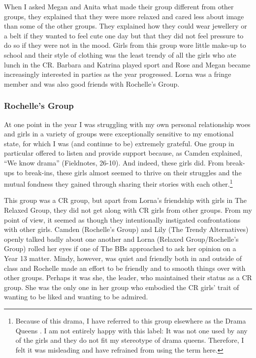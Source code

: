 
When I asked Megan and Anita what made their group different from other groups, they explained that they were more relaxed and cared less about image than some of the other groups. They explained how they could wear jewellery or a belt if they wanted to feel cute one day but that they did not feel pressure to do so if they were not in the mood. Girls from this group wore little make-up to school and their style of clothing was the least trendy of all the girls who ate lunch in the CR. Barbara and Katrina played sport and Rose and Megan became increasingly interested in parties as the year progressed. Lorna was a fringe member and was also good friends with Rochelle's Group.

\subsubsection{Rochelle's Group}
At one point in the year I was struggling with my own personal relationship woes and girls in a variety of groups were exceptionally sensitive to my emotional state, for which I was (and continue to be) extremely grateful. One group in particular offered to listen and provide support because, as Camden explained, ``We know drama'' (Fieldnotes, 26-10). And indeed, these girls did. From break-ups to break-ins, these girls almost seemed to thrive on their struggles and the mutual fondness they gained through sharing their stories with each other.\footnote{Because of this drama, I have referred to this group elsewhere as the Drama Queens \citep{drager2008lsa}. I am not entirely happy with this label: It was not one used by any of the girls and they do not fit my stereotype of drama queens. Therefore, I felt it was misleading and have refrained from using the term here.}

This group was a CR group, but apart from Lorna's friendship with girls in The Relaxed Group, they did not get along with CR girls from other groups. From my point of view, it seemed as though they intentionally instigated confrontations with other girls. Camden (Rochelle's Group) and Lily (The Trendy Alternatives) openly talked badly about one another and Lorna (Relaxed Group/Rochelle's Group) rolled her eyes if one of The BBs approached to ask her opinion on a Year 13 matter. Mindy, however, was quiet and friendly both in and outside of class and Rochelle made an effort to be friendly and to smooth things over with other groups. Perhaps it was she, the leader, who maintained their status as a CR group. She was the only one in her group who embodied the CR girls' trait of wanting to be liked and wanting to be admired.
 
